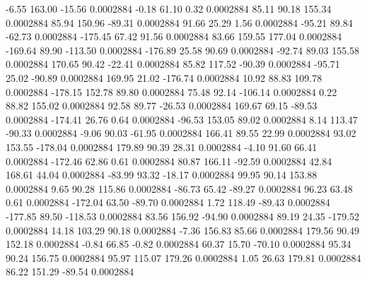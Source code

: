       -6.55      163.00      -15.56     0.0002884
       -0.18       61.10        0.32     0.0002884
       85.11       90.18      155.34     0.0002884
       85.94      150.96      -89.31     0.0002884
       91.66       25.29        1.56     0.0002884
      -95.21       89.84      -62.73     0.0002884
     -175.45       67.42       91.56     0.0002884
       83.66      159.55      177.04     0.0002884
     -169.64       89.90     -113.50     0.0002884
     -176.89       25.58       90.69     0.0002884
      -92.74       89.03      155.58     0.0002884
      170.65       90.42      -22.41     0.0002884
       85.82      117.52      -90.39     0.0002884
      -95.71       25.02      -90.89     0.0002884
      169.95       21.02     -176.74     0.0002884
       10.92       88.83      109.78     0.0002884
     -178.15      152.78       89.80     0.0002884
       75.48       92.14     -106.14     0.0002884
        0.22       88.82      155.02     0.0002884
       92.58       89.77      -26.53     0.0002884
      169.67       69.15      -89.53     0.0002884
     -174.41       26.76        0.64     0.0002884
      -96.53      153.05       89.02     0.0002884
        8.14      113.47      -90.33     0.0002884
       -9.06       90.03      -61.95     0.0002884
      166.41       89.55       22.99     0.0002884
       93.02      153.55     -178.04     0.0002884
      179.89       90.39       28.31     0.0002884
       -4.10       91.60       66.41     0.0002884
     -172.46       62.86        0.61     0.0002884
       80.87      166.11      -92.59     0.0002884
       42.84      168.61       44.04     0.0002884
      -83.99       93.32      -18.17     0.0002884
       99.95       90.14      153.88     0.0002884
        9.65       90.28      115.86     0.0002884
      -86.73       65.42      -89.27     0.0002884
       96.23       63.48        0.61     0.0002884
     -172.04       63.50      -89.70     0.0002884
        1.72      118.49      -89.43     0.0002884
     -177.85       89.50     -118.53     0.0002884
       83.56      156.92      -94.90     0.0002884
       89.19       24.35     -179.52     0.0002884
       14.18      103.29       90.18     0.0002884
       -7.36      156.83       85.66     0.0002884
      179.56       90.49      152.18     0.0002884
       -0.84       66.85       -0.82     0.0002884
       60.37       15.70      -70.10     0.0002884
       95.34       90.24      156.75     0.0002884
       95.97      115.07      179.26     0.0002884
        1.05       26.63      179.81     0.0002884
       86.22      151.29      -89.54     0.0002884
